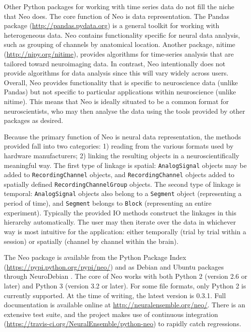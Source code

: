 \documentclass{frontiers}
\newcommand{\documentation}{\url{http://neuralensemble.org/neo/}}
\begin{document}
Other Python packages for working with time series data do not fill the niche that Neo does. 
The core function of Neo is data representation. 
The Pandas package (\url{http://pandas.pydata.org}) is a general toolkit for working with heterogeneous data. 
Neo contains functionality specific for neural data analysis, such as grouping of channels by anatomical location.
Another package, nitime (\url{http://nipy.org/nitime}), provides algorithms for time-series analysis that are tailored toward neuroimaging data.
In contrast, Neo intentionally does not provide algorithms for data analysis since this will vary widely across users.
Overall, Neo provides functionality that is specific to neuroscience data (unlike Pandas) but not specific to particular applications within neuroscience (unlike nitime).
This means that Neo is ideally situated to be a common format for neuroscientists, who may then analyse the data using the tools provided by other packages as desired.

Because the primary function of Neo is neural data representation, the methods provided fall into two categories: 1) reading from the various formats used by hardware manufacturers; 2) linking the resulting objects in a neuroscientifically meaningful way.
The first type of linkage is spatial: \lstinline`AnalogSignal` objects may be added to \lstinline`RecordingChannel` objects, and \lstinline`RecordingChannel` objects added to spatially defined \lstinline`RecordingChannelGroup` objects.
The second type of linkage is temporal: \lstinline`AnalogSignal` objects also belong to a \lstinline`Segment` object (representing a period of time), and \lstinline`Segment` belongs to \lstinline`Block` (representing an entire experiment).
Typically the provided IO methods construct the linkages in this hierarchy automatically.
The user may then iterate over the data in whichever way is most intuitive for the application: either temporally (trial by trial within a session) or spatially (channel by channel within the brain).

The Neo package is available from the Python Package Index (\url{https://pypi.python.org/pypi/neo/}) and as Debian and Ubuntu packages through NeuroDebian \citep{Halchenko2012}.
The core of Neo works with both Python 2 (version 2.6 or later) and Python 3 (version 3.2 or later).
For some file formats, only Python 2 is currently supported. At the time of writing, the latest version is 0.3.1.
Full documentation is available online at \documentation.
There is an extensive test suite, and the project makes use of continuous integration (\url{https://travis-ci.org/NeuralEnsemble/python-neo}) to rapidly catch regressions.
\end{document}
